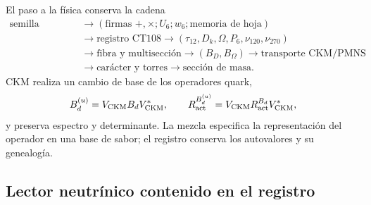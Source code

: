 El paso a la física conserva la cadena
\begin{equation}
 \begin{aligned}
 \text{semilla refinada}
 &\longrightarrow(\text{firmas }+,\times;U_6;w_6;
                   \text{memoria de hoja})\\
 &\longrightarrow\text{registro CT108}
 \longrightarrow(\tau_{12},D_k,\Omega,P_6,\nu_{120},\nu_{270})\\
 &\longrightarrow\text{fibra y multisección}
 \longrightarrow(B_D,B_\Omega)
 \longrightarrow\text{transporte CKM/PMNS}\\
 &\longrightarrow\text{carácter y torres}
 \longrightarrow\text{sección de masa}.
 \end{aligned}
 \label{eq:cadena-semilla-mezcla-masa-autonoma}
\end{equation}
CKM realiza un cambio de base de los operadores quark,
\begin{equation}
 B_d^{(u)}=V_{\rm CKM}B_dV_{\rm CKM}^*,
 \qquad
 R_{\rm act}^{B_d^{(u)}}
 =V_{\rm CKM}R_{\rm act}^{B_d}V_{\rm CKM}^*,
 \label{eq:ckm-transporte-semillas-autonoma}
\end{equation}
y preserva espectro y determinante. La mezcla especifica la representación
del operador en una base de sabor; el registro conserva los autovalores y su
genealogía.

\subsection{Lector neutrínico contenido en el registro}

